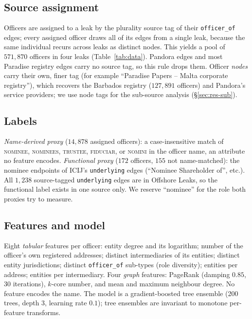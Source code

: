 \documentclass[11pt]{article}
\begin{document}
\subsection{Source assignment}\label{sec:sources}
Officers are assigned to a leak by the plurality source tag of their
\texttt{officer\_of} edges; every assigned officer draws all of its edges from a
single leak, because the same individual recurs across leaks as distinct nodes.
This yields a pool of $571{,}870$ officers in four leaks (Table~\ref{tab:data}).
Pandora edges and most Paradise registry edges carry no source tag, so this rule
drops them. Officer \emph{nodes} carry their own, finer tag (for example
``Paradise Papers -- Malta corporate registry''), which recovers the Barbados
registry ($127{,}891$ officers) and Pandora's service providers; we use node tags
for the sub-source analysis (\S\ref{sec:res-sub}).
\subsection{Labels}\label{sec:labels}
\emph{Name-derived proxy} ($14{,}878$ assigned officers): a case-insensitive match
of \textsc{nominee}, \textsc{nominees}, \textsc{trustee}, \textsc{fiduciar}, or
\textsc{nomini} in the officer name, an attribute no feature encodes.
\emph{Functional proxy} ($172$ officers, $155$ not name-matched): the nominee
endpoints of ICIJ's \texttt{underlying} edges (``Nominee Shareholder of'', etc.).
All $1{,}238$ source-tagged \texttt{underlying} edges are in Offshore Leaks, so the
functional label exists in one source only. We reserve ``nominee'' for the role
both proxies try to measure.
\subsection{Features and model}
Eight \emph{tabular} features per officer: entity degree and its logarithm; number
of the officer's own registered addresses; distinct intermediaries of its
entities; distinct entity jurisdictions; distinct \texttt{officer\_of} sub-types
(role diversity); entities per address; entities per intermediary. Four
\emph{graph} features: PageRank (damping $0.85$, 30 iterations), $k$-core number,
and mean and maximum neighbour degree. No feature encodes the name. The model is a
gradient-boosted tree ensemble (200 trees, depth 3, learning rate $0.1$);
tree ensembles are invariant to monotone per-feature transforms.
\end{document}
